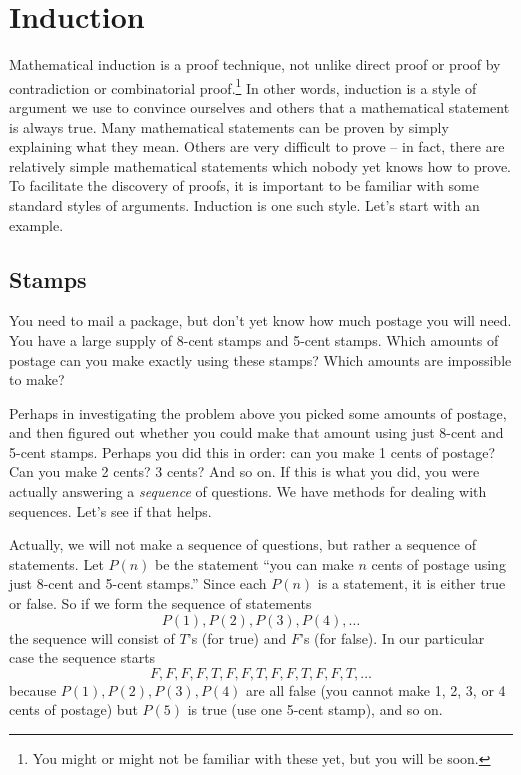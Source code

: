 \documentclass[12pt]{article}
\begin{document}
\section{Induction}\label{sec:induction}

Mathematical induction is a proof technique, not unlike direct proof or proof by contradiction or combinatorial proof.\footnote{You might or might not be familiar with these yet, but you will be soon.}  In other words, induction is a style of argument we use to convince ourselves and others that a mathematical statement is always true.  Many mathematical statements can be proven by simply explaining what they mean.  Others are very difficult to prove -- in fact, there are relatively simple mathematical statements which nobody yet knows how to prove.  To facilitate the discovery of proofs, it is important to be familiar with some standard styles of arguments.  Induction is one such style.  Let's start with an example.

\subsection{Stamps}

\begin{activity}
  You need to mail a package, but don't yet know how much postage you will need. You have
a large supply of 8-cent stamps and 5-cent stamps. Which amounts of postage can you make
exactly using these stamps? Which amounts are impossible to make?
\end{activity}

Perhaps in investigating the problem above you picked some amounts of postage, and then figured out whether you could make that amount using just 8-cent and 5-cent stamps.  Perhaps you did this in order: can you make 1 cents of postage?  Can you make 2 cents?  3 cents? And so on.  If this is what you did, you were actually answering a {\em sequence} of questions.  We have methods for dealing with sequences.  Let's see if that helps.

Actually, we will not make a sequence of questions, but rather a sequence of statements.  Let $P(n)$ be the statement ``you can make $n$ cents of postage using just 8-cent and 5-cent stamps.''  Since each $P(n)$ is a statement, it is either true or false.  So if we form the sequence of statements
\[P(1), P(2), P(3), P(4), \ldots\]
the sequence will consist of $T$'s (for true) and $F$'s (for false).  In our particular case the sequence starts
\[F,F,F,F,T,F,F,T,F,F,T,F,F,T,\ldots\]
because $P(1), P(2), P(3), P(4)$ are all false (you cannot make 1, 2, 3, or 4 cents of postage) but $P(5)$ is true (use one 5-cent stamp), and so on.  
\end{document}
